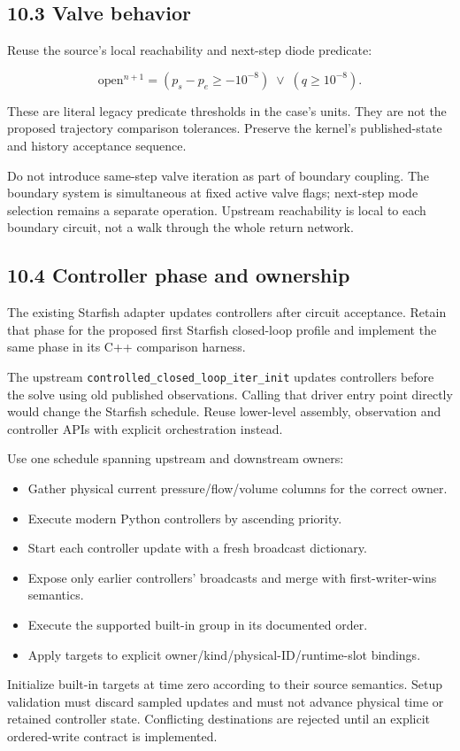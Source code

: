 \documentclass[11pt,a4paper]{article}
\begin{document}
\subsection{10.3 Valve behavior}
Reuse the source's local reachability and next-step diode predicate:


\nopagebreak[3]
\[
\mathrm{open}^{n+1}=
(p_s-p_e\ge-10^{-8})\;\lor\;(q\ge10^{-8}).
\]


These are literal legacy predicate thresholds in the case's units. They are not the proposed trajectory comparison tolerances. Preserve the kernel's published-state and history acceptance sequence.

Do not introduce same-step valve iteration as part of boundary coupling. The boundary system is simultaneous at fixed active valve flags; next-step mode selection remains a separate operation. Upstream reachability is local to each boundary circuit, not a walk through the whole return network.

\subsection{10.4 Controller phase and ownership}
The existing Starfish adapter updates controllers after circuit acceptance. Retain that phase for the proposed first Starfish closed-loop profile and implement the same phase in its C++ comparison harness.

The upstream \texttt{controlled\_\allowbreak{}closed\_\allowbreak{}loop\_\allowbreak{}iter\_\allowbreak{}init} updates controllers before the solve using old published observations. Calling that driver entry point directly would change the Starfish schedule. Reuse lower-level assembly, observation and controller APIs with explicit orchestration instead.

Use one schedule spanning upstream and downstream owners:


\begin{itemize}
\item Gather physical current pressure/flow/volume columns for the correct owner.


\item Execute modern Python controllers by ascending priority.


\item Start each controller update with a fresh broadcast dictionary.


\item Expose only earlier controllers' broadcasts and merge with first-writer-wins semantics.


\item Execute the supported built-in group in its documented order.


\item Apply targets to explicit owner/kind/physical-ID/runtime-slot bindings.


\end{itemize}
Initialize built-in targets at time zero according to their source semantics. Setup validation must discard sampled updates and must not advance physical time or retained controller state. Conflicting destinations are rejected until an explicit ordered-write contract is implemented.
\end{document}
